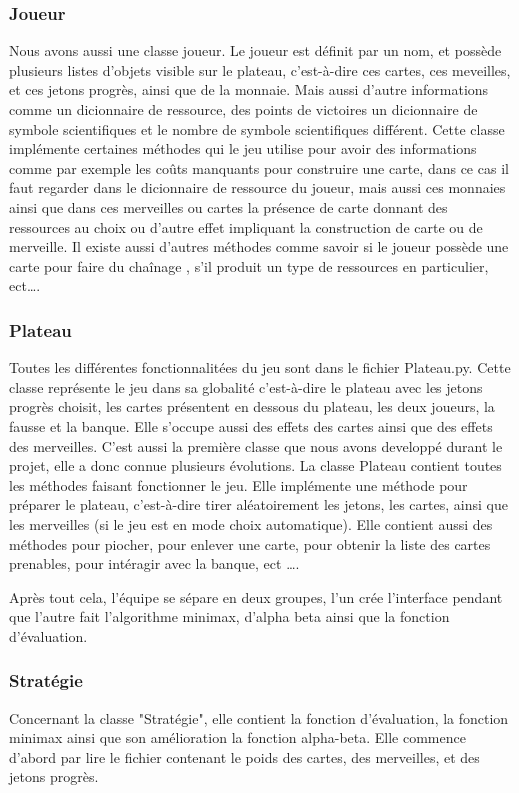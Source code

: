 \documentclass[a4paper, 12pt, french]{article}
\begin{document}
	\subsubsection{Joueur}
		Nous avons aussi une classe joueur. Le joueur est définit par un nom, et possède plusieurs listes
		d'objets visible sur le plateau, c'est-à-dire ces cartes, ces meveilles, et ces jetons progrès, ainsi 
		que de la monnaie. Mais aussi d'autre informations comme un dicionnaire de ressource, des points de victoires
		un dicionnaire de symbole scientifiques et le nombre de symbole scientifiques différent. Cette classe
		implémente certaines méthodes qui le jeu utilise pour avoir des informations comme par exemple
		les coûts manquants pour construire une carte, dans ce cas il faut regarder dans le dicionnaire de ressource
		du joueur, mais aussi ces monnaies ainsi que dans ces merveilles ou cartes la présence de carte donnant des
		ressources au choix ou d'autre effet impliquant la construction de carte ou de merveille. 
		Il existe aussi d'autres méthodes comme savoir si le joueur possède une carte pour faire du chaînage
		, s'il produit un type de ressources en particulier, ect\ldots.

	\subsubsection{Plateau}
		Toutes les différentes fonctionnalitées du jeu sont dans le fichier Plateau.py. Cette classe
		représente le jeu dans sa globalité c'est-à-dire le plateau avec les jetons progrès choisit,
		les cartes présentent en dessous du plateau, les deux joueurs, la fausse et la banque.
		Elle s'occupe aussi des effets des cartes ainsi que des effets des merveilles.
		C'est aussi la première classe que nous avons developpé durant le projet, elle a donc connue
		plusieurs évolutions.
		La classe Plateau contient toutes les méthodes faisant fonctionner le jeu. Elle 
		implémente une méthode pour préparer le plateau, c'est-à-dire
		tirer aléatoirement les jetons, les cartes, ainsi que les merveilles (si le jeu
		est en mode choix automatique). Elle contient aussi des méthodes pour piocher, 
		pour enlever une carte, pour obtenir la liste des cartes prenables, pour intéragir
		avec la banque, ect \ldots.

		Après tout cela, l'équipe se sépare en deux groupes, l'un crée l'interface pendant que l'autre fait
		l'algorithme minimax, d'alpha beta ainsi que la fonction d'évaluation.

	\subsubsection{Stratégie}
		Concernant la classe "Stratégie", elle contient la fonction d'évaluation, la fonction
		minimax ainsi que son amélioration la fonction alpha-beta.
		Elle commence d'abord par lire le fichier contenant le poids des cartes, des merveilles, et des jetons progrès.
		
\end{document}
